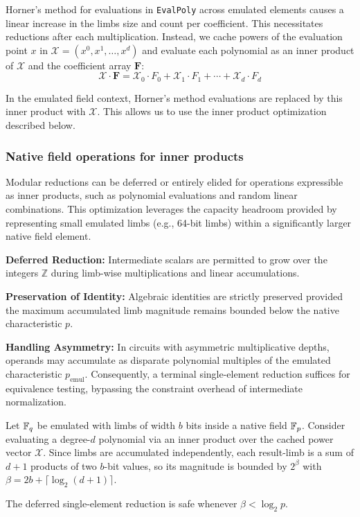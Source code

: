 Horner's method for evaluations in \texttt{EvalPoly} across emulated elements causes a linear increase in the limbs size and count per coefficient.
This necessitates reductions after each multiplication.
Instead, we cache powers of the evaluation point $x$ in $\mathcal{X} = (x^0, x^1, \ldots, x^d)$ and evaluate each polynomial as an inner product of $\mathcal{X}$ and the coefficient array $\mathbf{F}$:
$$\mathcal{X} \cdot \mathbf{F} = \mathcal{X}_0 \cdot F_0 + \mathcal{X}_1 \cdot F_1 + \cdots + \mathcal{X}_d \cdot F_d$$

In the emulated field context, Horner's method evaluations are replaced by this inner product with $\mathcal{X}$. This allows us to use the inner product optimization described below.

\subsubsection{Native field operations for inner products}

Modular reductions can be deferred or entirely elided for operations expressible as inner products, such as polynomial evaluations and random linear combinations. This optimization leverages the capacity headroom provided by representing small emulated limbs (e.g., 64-bit limbs) within a significantly larger native field element.

\textbf{Deferred Reduction:} Intermediate scalars are permitted to grow over the integers $\mathbb{Z}$ during limb-wise multiplications and linear accumulations.

\textbf{Preservation of Identity:} Algebraic identities are strictly preserved provided the maximum accumulated limb magnitude remains bounded below the native characteristic $p$.

\textbf{Handling Asymmetry:} In circuits with asymmetric multiplicative depths, operands may accumulate as disparate polynomial multiples of the emulated characteristic $p_{\text{emul}}$. Consequently, a terminal single-element reduction suffices for equivalence testing, bypassing the constraint overhead of intermediate normalization.

\begin{lemma}\label{lem:overflow}
Let $\mathbb{F}_q$ be emulated with limbs of width $b$ bits inside a native field $\mathbb{F}_p$.
Consider evaluating a degree-$d$ polynomial via an inner product over the cached
power vector $\mathcal{X}$.
Since limbs are accumulated independently, each result-limb is a sum of $d+1$
products of two $b$-bit values, so its magnitude is bounded by $2^{\beta}$ with $\beta = 2b + \lceil\log_2(d+1)\rceil$.

The deferred single-element reduction is safe whenever $\beta < \log_2 p$.
\end{lemma}

